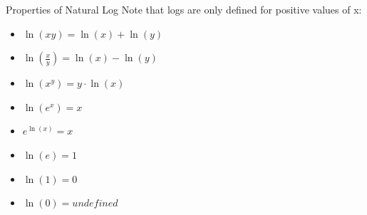 \documentclass[aspectratio=169]{beamer}
\begin{document}
\begin{frame}{Properties of Natural Log}\label{main1}
\hypertarget{naturallogslide}{}
Note that logs are only defined for positive values of x:
\begin{itemize}
\begin{itemize}
    \item $\ln(xy) = \ln(x) + \ln(y)$
    \item $\ln\left(\frac{x}{y}\right) = \ln(x) - \ln(y)$
    \item $\ln(x^y) = y \cdot \ln(x)$
    \item $\ln(e^x) = x$
    \item $e^{\ln(x)} = x$
    \item $\ln(e) = 1$
    \item $\ln(1) = 0$
    \item $\ln(0) = undefined$
\end{itemize}
\end{itemize}
\end{frame}
\end{document}

